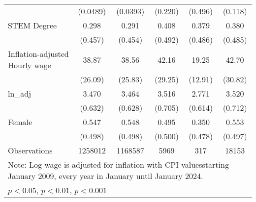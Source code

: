 \begin{table}[htbp]
\begin{tabular}{l*{5}{c}}
                    &    (0.0489)         &    (0.0393)         &     (0.220)         &     (0.496)         &     (0.118)         \\
[1em]
STEM Degree         &       0.298         &       0.291         &       0.408         &       0.379         &       0.380         \\
                    &     (0.457)         &     (0.454)         &     (0.492)         &     (0.486)         &     (0.485)         \\
[1em]
Inflation-adjusted Hourly wage&       38.87         &       38.56         &       42.16         &       19.25         &       42.70         \\
                    &     (26.09)         &     (25.83)         &     (29.25)         &     (12.91)         &     (30.82)         \\
[1em]
ln\_adj              &       3.470         &       3.464         &       3.516         &       2.771         &       3.520         \\
                    &     (0.632)         &     (0.628)         &     (0.705)         &     (0.614)         &     (0.712)         \\
[1em]
Female              &       0.547         &       0.548         &       0.495         &       0.350         &       0.553         \\
                    &     (0.498)         &     (0.498)         &     (0.500)         &     (0.478)         &     (0.497)         \\
\hline
Observations        &     1258012         &     1168587         &        5969         &         317         &       18153         \\
\hline\hline
\multicolumn{6}{l}{\footnotesize Note: Log wage is adjusted for inflation with CPI valuesstarting January 2009, every year in January until January 2024.}\\
\multicolumn{6}{l}{\footnotesize \sym{*} \(p<0.05\), \sym{**} \(p<0.01\), \sym{***} \(p<0.001\)}\\
\end{tabular}
\end{table}

